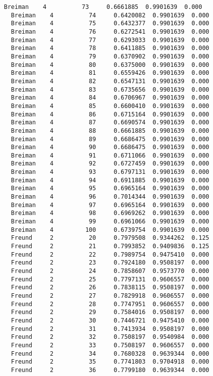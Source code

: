\documentclass[11pt]{article}
\begin{document}
\begin{Verbatim}[commandchars=\\\{\}]
  Breiman    4          73     0.6661885  0.9901639  0.000
  Breiman    4          74     0.6420082  0.9901639  0.000
  Breiman    4          75     0.6432377  0.9901639  0.000
  Breiman    4          76     0.6272541  0.9901639  0.000
  Breiman    4          77     0.6293033  0.9901639  0.000
  Breiman    4          78     0.6411885  0.9901639  0.000
  Breiman    4          79     0.6370902  0.9901639  0.000
  Breiman    4          80     0.6375000  0.9901639  0.000
  Breiman    4          81     0.6559426  0.9901639  0.000
  Breiman    4          82     0.6547131  0.9901639  0.000
  Breiman    4          83     0.6735656  0.9901639  0.000
  Breiman    4          84     0.6706967  0.9901639  0.000
  Breiman    4          85     0.6600410  0.9901639  0.000
  Breiman    4          86     0.6715164  0.9901639  0.000
  Breiman    4          87     0.6690574  0.9901639  0.000
  Breiman    4          88     0.6661885  0.9901639  0.000
  Breiman    4          89     0.6686475  0.9901639  0.000
  Breiman    4          90     0.6686475  0.9901639  0.000
  Breiman    4          91     0.6711066  0.9901639  0.000
  Breiman    4          92     0.6727459  0.9901639  0.000
  Breiman    4          93     0.6797131  0.9901639  0.000
  Breiman    4          94     0.6911885  0.9901639  0.000
  Breiman    4          95     0.6965164  0.9901639  0.000
  Breiman    4          96     0.7014344  0.9901639  0.000
  Breiman    4          97     0.6965164  0.9901639  0.000
  Breiman    4          98     0.6969262  0.9901639  0.000
  Breiman    4          99     0.6961066  0.9901639  0.000
  Breiman    4         100     0.6739754  0.9901639  0.000
  Freund     2          20     0.7979508  0.9344262  0.125
  Freund     2          21     0.7993852  0.9409836  0.125
  Freund     2          22     0.7989754  0.9475410  0.000
  Freund     2          23     0.7924180  0.9508197  0.000
  Freund     2          24     0.7858607  0.9573770  0.000
  Freund     2          25     0.7797131  0.9606557  0.000
  Freund     2          26     0.7838115  0.9508197  0.000
  Freund     2          27     0.7829918  0.9606557  0.000
  Freund     2          28     0.7747951  0.9606557  0.000
  Freund     2          29     0.7584016  0.9508197  0.000
  Freund     2          30     0.7446721  0.9475410  0.000
  Freund     2          31     0.7413934  0.9508197  0.000
  Freund     2          32     0.7508197  0.9540984  0.000
  Freund     2          33     0.7508197  0.9606557  0.000
  Freund     2          34     0.7680328  0.9639344  0.000
  Freund     2          35     0.7741803  0.9704918  0.000
  Freund     2          36     0.7799180  0.9639344  0.000

\end{Verbatim}
\end{document}
